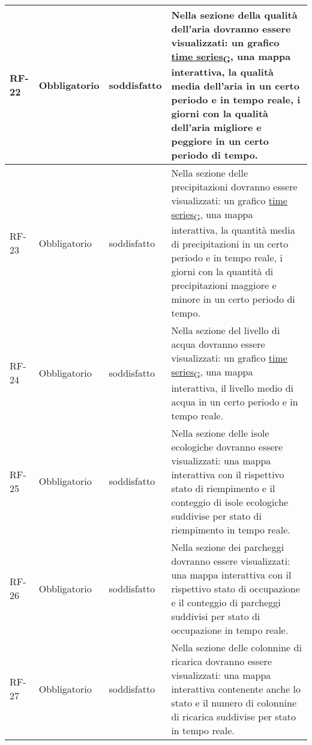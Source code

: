 \begin{longtable}{|>{\centering\arraybackslash}m{}|>{\centering\arraybackslash}m{}|>{\centering\arraybackslash}m{}|>{\centering\arraybackslash}m{}|}
	\\\hline
	RF-22           & Obbligatorio        & soddisfatto                                                                                                           & Nella sezione della qualità dell'aria dovranno essere visualizzati: un grafico \href{https://7last.github.io/docs/pb/documentazione-interna/glossario\#time-series}{time series\textsubscript{G}}, una mappa interattiva, la qualità media dell'aria in un certo periodo e in tempo reale, i giorni con la qualità dell'aria migliore e peggiore in un certo periodo di tempo.
	\\\hline
	RF-23           & Obbligatorio        & soddisfatto                                                                                                           & Nella sezione delle precipitazioni dovranno essere visualizzati: un grafico \href{https://7last.github.io/docs/pb/documentazione-interna/glossario\#time-series}{time series\textsubscript{G}}, una mappa interattiva, la quantità media di precipitazioni in un certo periodo e in tempo reale, i giorni con la quantità di precipitazioni maggiore e minore in un certo periodo di tempo.
	\\\hline
	RF-24           & Obbligatorio        & soddisfatto                                                                                                           & Nella sezione del livello di acqua dovranno essere visualizzati: un grafico \href{https://7last.github.io/docs/pb/documentazione-interna/glossario\#time-series}{time series\textsubscript{G}}, una mappa interattiva, il livello medio di acqua in un certo periodo e in tempo reale.
	\\\hline
	RF-25           & Obbligatorio        & soddisfatto                                                                                                           & Nella sezione delle isole ecologiche dovranno essere visualizzati: una mappa interattiva con il rispettivo stato di riempimento e il conteggio di isole ecologiche suddivise per stato di riempimento in tempo reale.
	\\\hline
	RF-26           & Obbligatorio        & soddisfatto                                                                                                           & Nella sezione dei parcheggi dovranno essere visualizzati: una mappa interattiva con il rispettivo stato di occupazione e il conteggio di parcheggi suddivisi per stato di occupazione in tempo reale.
	\\\hline
	RF-27           & Obbligatorio        & soddisfatto                                                                                                           & Nella sezione delle colonnine di ricarica dovranno essere visualizzati: una mappa interattiva contenente anche lo stato e il numero di colonnine di ricarica suddivise per stato in tempo reale.

\end{longtable}

